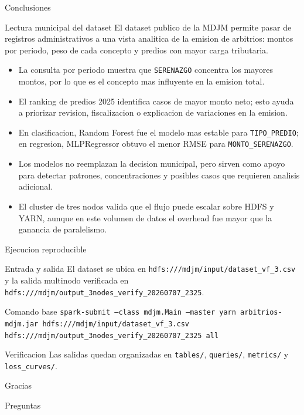 \documentclass[aspectratio=169,11pt]{beamer}
\begin{document}
\begin{frame}{Conclusiones}
    \begin{block}{Lectura municipal del dataset}
        El dataset publico de la MDJM permite pasar de registros administrativos a una vista analitica de la emision de arbitrios: montos por periodo, peso de cada concepto y predios con mayor carga tributaria.
    \end{block}

    \begin{itemize}
        \item La consulta por periodo muestra que \texttt{SERENAZGO} concentra los mayores montos, por lo que es el concepto mas influyente en la emision total.
        \item El ranking de predios 2025 identifica casos de mayor monto neto; esto ayuda a priorizar revision, fiscalizacion o explicacion de variaciones en la emision.
        \item En clasificacion, Random Forest fue el modelo mas estable para \texttt{TIPO\_PREDIO}; en regresion, MLPRegressor obtuvo el menor RMSE para \texttt{MONTO\_SERENAZGO}.
        \item Los modelos no reemplazan la decision municipal, pero sirven como apoyo para detectar patrones, concentraciones y posibles casos que requieren analisis adicional.
        \item El cluster de tres nodos valida que el flujo puede escalar sobre HDFS y YARN, aunque en este volumen de datos el overhead fue mayor que la ganancia de paralelismo.
    \end{itemize}
\end{frame}

\begin{frame}{Ejecucion reproducible}
    \small
    \begin{block}{Entrada y salida}
        El dataset se ubica en \texttt{hdfs:///mdjm/input/dataset\_vf\_3.csv} y la salida multinodo verificada en \texttt{hdfs:///mdjm/output\_3nodes\_verify\_20260707\_2325}.
    \end{block}

    \begin{block}{Comando base}
        \texttt{spark-submit --class mdjm.Main --master yarn arbitrios-mdjm.jar hdfs:///mdjm/input/dataset\_vf\_3.csv hdfs:///mdjm/output\_3nodes\_verify\_20260707\_2325 all}
    \end{block}

    \begin{block}{Verificacion}
        Las salidas quedan organizadas en \texttt{tables/}, \texttt{queries/}, \texttt{metrics/} y \texttt{loss\_curves/}.
    \end{block}
\end{frame}

\begin{frame}
    \centering
    \Huge Gracias

    \vspace{0.6cm}
    \large Preguntas
\end{frame}
\end{document}
